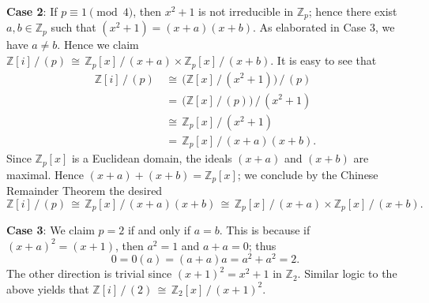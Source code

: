 \documentclass[11pt]{article}
\begin{document}
\textbf{Case 2}: If $p \equiv 1 \pmod{4}$, then $x^{2} + 1$ is not irreducible in $\mathbb{Z}_{p}$; hence there exist $a, b \in \mathbb{Z}_{p}$ such that $(x^{2} + 1) = (x + a)(x + b)$. As elaborated in Case 3, we have $a \ne b$. Hence we claim $\boxed{\mathbb{Z}[i] \, / \, (p) \, \cong \, \mathbb{Z}_{p}[x] \, / \, (x + a) \times \mathbb{Z}_{p}[x] \, / \, (x + b)}$. It is easy to see that
\begin{align*}
  \mathbb{Z}[i] \, / \, (p)  \, & \cong \,  \big( \mathbb{Z}[x] \, / \, (x^{2} + 1) \big) \, / \, (p) \\
                                 & = \, \big( \mathbb{Z}[x] \, / \, (p) \big) \, / \, (x^{2} + 1) \\
                                 & \cong \, \mathbb{Z}_{p}[x] \, / \, (x^{2} + 1) \\
                                 & = \, \mathbb{Z}_{p}[x] \, / \, (x + a)(x + b).
\end{align*}
Since $\mathbb{Z}_{p}[x]$ is a Euclidean domain, the ideals $(x + a)$ and $(x + b)$ are maximal. Hence $(x + a) + (x + b) = \mathbb{Z}_{p}[x]$; we conclude by the Chinese Remainder Theorem the desired
\[
  \mathbb{Z}[i] \, / \, (p) \, \cong \, \mathbb{Z}_{p}[x] \, / \, (x + a)(x + b) \, \cong \, \mathbb{Z}_{p}[x] \, / \, (x + a) \times \mathbb{Z}_{p}[x] \, / \, (x + b).
\]

\textbf{Case 3}: We claim $p = 2$ if and only if $a = b$. This is because if $(x + a)^{2} = (x + 1)$, then $a^{2} = 1$ and $a + a = 0$; thus
\[
  0 = 0(a) = (a + a)a = a^{2} + a^{2} = 2.
\]
The other direction is trivial since $(x + 1)^{2} = x^{2} + 1$ in $\mathbb{Z}_{2}$. Similar logic to the above yields that $\boxed{\mathbb{Z}[i] \, / \, (2) \, \cong \, \mathbb{Z}_{2}[x] \, / \, (x + 1)^{2}}$.

\end{document}
